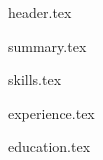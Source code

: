 \documentclass[11pt, a4paper]{extarticle}
\begin{document}
	{header.tex}

	{summary.tex}
	
	{skills.tex}

	{experience.tex}
	
	{education.tex}
\end{document}
